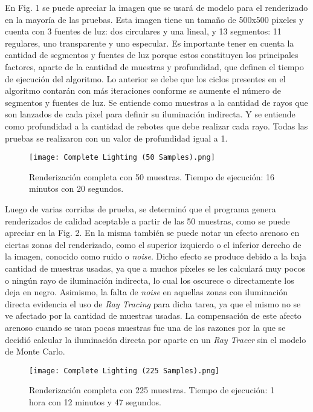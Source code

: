 \documentclass[conference]{IEEEtran}
\begin{document}
En Fig. 1 se puede apreciar la imagen que se usará de modelo para el renderizado en la mayoría de las pruebas. Esta imagen tiene un tamaño de 500x500 pixeles y cuenta con 3 fuentes de luz: dos circulares y una lineal, y 13 segmentos: 11 regulares, uno transparente y uno especular. Es importante tener en cuenta la cantidad de segmentos y fuentes de luz porque estos constituyen los principales factores, aparte de la cantidad de muestras y profundidad, que definen el tiempo de ejecución del algoritmo. Lo anterior se debe que los ciclos presentes en el algoritmo contarán con más iteraciones conforme se aumente el número de segmentos y fuentes de luz. Se entiende como muestras a la cantidad de rayos que son lanzados de cada pixel para definir su iluminación indirecta. Y se entiende como profundidad a la cantidad de rebotes que debe realizar cada rayo. Todas las pruebas se realizaron con un valor de profundidad igual a 1.

\begin{figure}[htbp]
\centerline{\texttt{[image: Complete Lighting (50 Samples).png]}}
\caption{Renderización completa con 50 muestras. Tiempo de ejecución: 16 minutos con 20 segundos.}
\label{50 muestras completo}
\end{figure}

Luego de varias corridas de prueba, se determinó que el programa genera renderizados de calidad aceptable a partir de las 50 muestras, como se puede apreciar en la Fig. 2. En la misma también se puede notar un efecto arenoso en ciertas zonas del renderizado, como el superior izquierdo o el inferior derecho de la imagen, conocido como ruido o \textit{noise}. Dicho efecto se produce debido a la baja cantidad de muestras usadas, ya que a muchos píxeles se les calculará muy pocos o ningún rayo de iluminación indirecta, lo cual los oscurece o directamente los deja en negro. Asimismo, la falta de \textit{noise} en aquellas zonas con iluminación directa evidencia el uso de \textit{Ray Tracing} para dicha tarea, ya que el mismo no se ve afectado por la cantidad de muestras usadas. La compensación de este afecto arenoso cuando se usan pocas muestras fue una de las razones por la que se decidió calcular la iluminación directa por aparte en un \textit{Ray Tracer} sin el modelo de Monte Carlo.

\begin{figure}[htbp]
\centerline{\texttt{[image: Complete Lighting (225 Samples).png]}}
\caption{Renderización completa con 225 muestras. Tiempo de ejecución: 1 hora con 12 minutos y 47 segundos.}
\label{225 muestras completo}
\end{figure}
\end{document}
